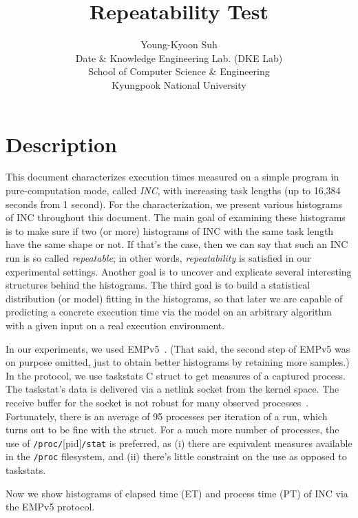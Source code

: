 \documentclass[10pt]{article}
\begin{document}
\title{Repeatability Test}

\author{
Young-Kyoon Suh\\ 
Date \& Knowledge Engineering Lab. (DKE Lab) \\
School of Computer Science \& Engineering\\
Kyungpook National University
}
\maketitle

\section{Description}
This document characterizes execution times 
measured on a simple program in pure-computation mode, called {\em INC}, 
with increasing task lengths (up to 16,384 seconds from 1 second). 
For the characterization, we present various histograms of INC throughout this document.
The main goal of examining these histograms is to make sure if 
two (or more) histograms of INC with the same task length 
have the same shape or not. If that's the case, then we can say that such an INC run is so called {\em repeatable}; 
in other words, {\em repeatability} is satisfied in our experimental settings. 
Another goal is to uncover and explicate several interesting structures behind the histograms. 
The third goal is to build a statistical distribution (or model) fitting in the histograms, so that later we 
are capable of predicting a concrete execution time via 
the model on an arbitrary algorithm with a given input on a real execution environment.

In our experiments, we used EMPv5~\cite{EMP}. 
(That said, the second step of EMPv5 was on purpose omitted, just to obtain better histograms by retaining more samples.) 
In the protocol, we use taskstats C struct to get measures of a captured process. 
The taskstat's data is delivered via a netlink socket from the kernel space. 
The receive buffer for the socket is not robust for many observed processes~\cite{Metrology}. 
Fortunately, there is an average of 95 processes per iteration of a run, 
which turns out to be fine with the struct. 
For a much more number of processes, 
the use of  {\tt /proc/}[pid]{\tt{/stat}} is preferred, 
as (i) there are equivalent measures available in the {\tt /proc} filesystem, 
and (ii) there's little constraint on the use as opposed to taskstats. 

Now we show histograms of elapsed time (ET) and process time (PT) of INC via the EMPv5 protocol.
\end{document}
